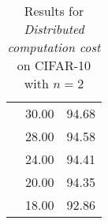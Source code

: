 \begin{table}[h]
\begin{tabular}{|c||cc|}
                            & 30.00                       & 94.68        \\
                            & 28.00                       & 94.58        \\
                            & 24.00                       & 94.41        \\
                            & 20.00                       & 94.35        \\
                            & 18.00                       & 92.86        \\ \hline
\end{tabular}
\caption{Results for \textit{Distributed computation cost} on CIFAR-10 with $n=2$}
\label{cif10_para2}
\end{table}